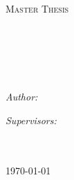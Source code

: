 \documentclass[
12pt, %
openany,
english, %
onehalfspacing, %
headsepline, %
]{MastersDoctoralThesis} %
\author{Neel Johann \textsc{Peters}} %
\begin{document}
\frontmatter %

\pagestyle{plain} %


\begin{titlepage}
\begin{center}

{\scshape\LARGE \univname\par}\vspace{1.5cm} %
\textsc{\Large Master Thesis}\\[0.5cm] %
\textsc{ \groupname}\\[0cm]
\textsc{ \deptname}\\[0.5cm]




\HRule \\[0.4cm] %
{\huge \bfseries \ttitle\par}\vspace{0.4cm} %
\HRule \\[1.5cm] %
 
\begin{minipage}[t]{0.4\textwidth}
\begin{flushleft} \large
\emph{Author:}\\
{\authorname} %
\end{flushleft}
\end{minipage}
\begin{minipage}[t]{0.4\textwidth}
\begin{flushright} \large
\emph{Supervisors:} \\
{\supname}\\ %
{\examname}
\end{flushright}
\end{minipage}\\[3cm]
 
 
{\large \today}\\[4cm] %
 
\vfill
\end{center}
\end{titlepage}
\end{document}
